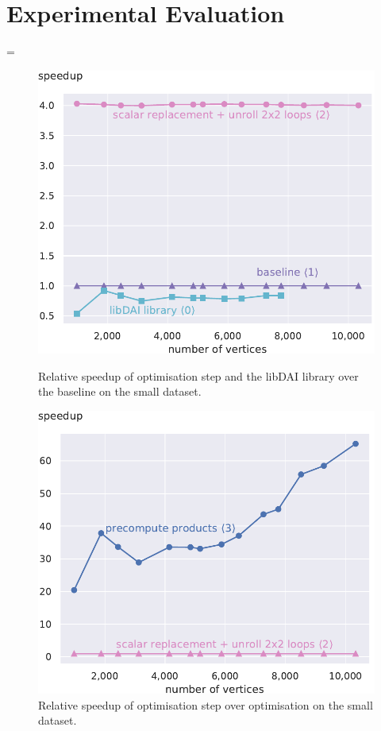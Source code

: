 \documentclass[final,letterpaper]{article}
\begin{document}
\section{Experimental Evaluation}\label{sec:exp}

\oldlinewidth=\linewidth
\begin{figure}[!t] %
\begin{minipage}[t]{\oldlinewidth}\centering
	\includegraphics[width=\linewidth]{img/speedup[0][1][2]_small.pdf}
	\caption{Relative speedup of optimisation step  and the libDAI library  over the baseline  on the small dataset. \label{libSpeedupSmall}}
\end{minipage}%
\hspace{7.2mm}
\begin{minipage}[t]{\oldlinewidth}\centering
	\includegraphics[width=\linewidth]{img/speedup[2][3]_small.pdf}
	\caption{Relative speedup of optimisation step  over optimisation  on the small dataset. \label{precomputeSpeedupSmall}}
\end{minipage}%
\end{figure}
\end{document}
